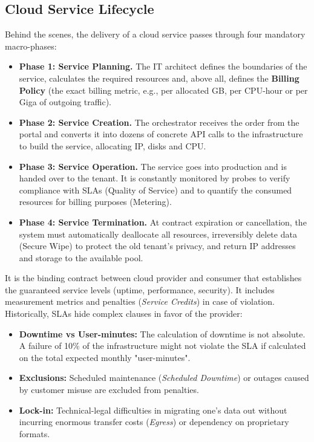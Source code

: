 \subsection{Cloud Service Lifecycle}
Behind the scenes, the delivery of a cloud service passes through four mandatory macro-phases:
\begin{itemize}
    \item \textbf{Phase 1: Service Planning.} The IT architect defines the boundaries of the service, calculates the required resources and, above all, defines the \textbf{Billing Policy} (the exact billing metric, e.g., per allocated GB, per CPU-hour or per Giga of outgoing traffic).
    \item \textbf{Phase 2: Service Creation.} The orchestrator receives the order from the portal and converts it into dozens of concrete API calls to the infrastructure to build the service, allocating IP, disks and CPU.
    \item \textbf{Phase 3: Service Operation.} The service goes into production and is handed over to the tenant. It is constantly monitored by probes to verify compliance with SLAs (Quality of Service) and to quantify the consumed resources for billing purposes (Metering).
    \item \textbf{Phase 4: Service Termination.} At contract expiration or cancellation, the system must automatically deallocate all resources, irreversibly delete data (Secure Wipe) to protect the old tenant's privacy, and return IP addresses and storage to the available pool.
\end{itemize}

\begin{definitionbox}
It is the binding contract between cloud provider and consumer that establishes the guaranteed service levels (uptime, performance, security). It includes measurement metrics and penalties (\textit{Service Credits}) in case of violation. Historically, SLAs hide complex clauses in favor of the provider: 
\begin{itemize}
    \item \textbf{Downtime vs User-minutes:} The calculation of downtime is not absolute. A failure of 10\% of the infrastructure might not violate the SLA if calculated on the total expected monthly "user-minutes".
    \item \textbf{Exclusions:} Scheduled maintenance (\textit{Scheduled Downtime}) or outages caused by customer misuse are excluded from penalties.
    \item \textbf{Lock-in:} Technical-legal difficulties in migrating one's data out without incurring enormous transfer costs (\textit{Egress}) or dependency on proprietary formats.
\end{itemize}
\end{definitionbox}


